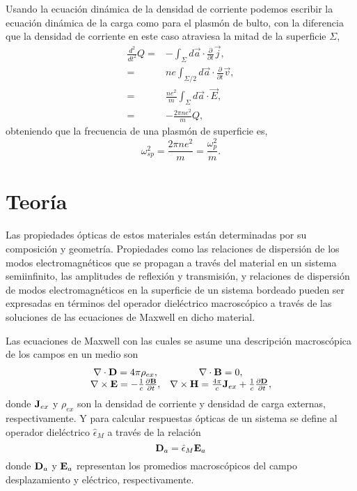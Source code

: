 \documentclass[12pt]{article}
\begin{document}
Usando la ecuación dinámica de la densidad de corriente podemos
escribir la ecuación dinámica de la carga como para el plasmón de
bulto, con la diferencia que la densidad de corriente en este caso
atraviesa la mitad de la superficie $\Sigma $,
\begin{equation}
  \begin{split}
    \frac{d^{2}}{dt^{2}}Q = & -\int_{\Sigma}d\vec{a}\cdot\frac{\partial}{\partial t}\vec{j},\\
    = & ne \int_{\Sigma/2}d\vec{a}\cdot\frac{\partial}{\partial t}\vec{v},\\
    = & \frac{ne^{2}}{m}\int_{\Sigma}d\vec{a}\cdot \vec{E}, \\
    = & -\frac{2\pi ne^{2}}{m}Q,
  \end{split}
\end{equation}
obteniendo que la frecuencia de una plasmón de superficie es,
\begin{equation}
  \omega_{sp}^{2}=\frac{2\pi ne^{2}}{m} = \frac{\omega_{p}^{2}}{m}.
  \label{surfaceplasmonfrecuency}
\end{equation}  
    

\section{Teoría}

Las propiedades ópticas de estos materiales están determinadas por su
composición y geometría. Propiedades como las relaciones de dispersión
de los modos electromagnéticos que se propagan a través del material
en un sistema semiinfinito, las amplitudes de reflexión y transmisión,
y relaciones de dispersión de modos electromagnéticos en la superficie
de un sistema bordeado pueden ser expresadas en términos del operador
dieléctrico macroscópico a través de las soluciones de las ecuaciones
de Maxwell en dicho material.

Las ecuaciones de Maxwell con las cuales se asume una descripción
macroscópica de los campos en un medio son
\begin{equation}
  \label{Maxwell-eqs}
  \begin{array}{cc}
    \nabla \cdot {\bf D} = 4\pi \rho_{ex}, & \nabla \cdot {\bf B} =0, \\
    \nabla \times {\bf E} = -\frac{1}{c}\frac{\partial {\bf B}}{\partial t}, &
    \nabla \times {\bf H} = \frac{4\pi}{c}{\bf
      J}_{ex} + \frac{1}{c}\frac{\partial {\bf D}}{\partial t},
  \end{array}
\end{equation}
donde ${\bf J}_{ex}$ y $\rho_{ex}$ son la densidad de corriente y
densidad de carga externas, respectivamente. Y para calcular
respuestas ópticas de un sistema se define al operador dieléctrico
$\hat{\epsilon}_{M}$ a través de la relación
\begin{equation}
  {\bf D}_{a} = \hat{\epsilon}_{M} {\bf E}_{a}
  \label{Def-Dilectric-Op}
\end{equation}
donde ${\bf D}_{a}$ y ${\bf E}_{a}$ representan los promedios macroscópicos del
campo desplazamiento y eléctrico, respectivamente.
\end{document}
